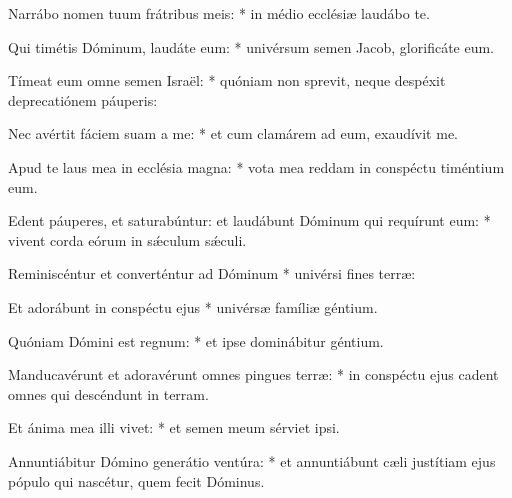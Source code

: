 \begin{psalmus}
Narrábo nomen tuum frátribus meis: * in médio ecclésiæ laudábo te.

Qui timétis Dóminum, laudáte eum: * univérsum semen Jacob, glorificáte eum.

Tímeat eum omne semen Israël: * quóniam non sprevit, neque despéxit deprecatiónem páuperis:

Nec avértit fáciem suam a me: * et cum clamárem ad eum, exaudívit me.

Apud te laus mea in ecclésia magna: * vota mea reddam in conspéctu timéntium eum.

Edent páuperes, et saturabúntur: et laudábunt Dóminum qui requírunt eum: * vivent corda eórum in sǽculum sǽculi.

Reminiscéntur et converténtur ad Dóminum * univérsi fines terræ:

Et adorábunt in conspéctu ejus * univérsæ famíliæ géntium.

Quóniam Dómini est regnum: * et ipse dominábitur géntium.

Manducavérunt et adoravérunt omnes pingues terræ: * in conspéctu ejus cadent omnes qui descéndunt in terram.

Et ánima mea illi vivet: * et semen meum sérviet ipsi.

Annuntiábitur Dómino generátio ventúra: * et annuntiábunt cæli justítiam ejus pópulo qui nascétur, quem fecit Dóminus.

\end{psalmus}

